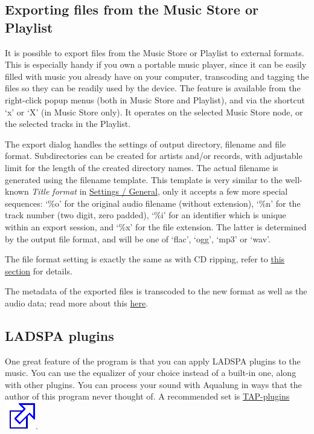 \documentclass[10pt,english]{article}
\begin{document}
\subsection{Exporting files from the Music Store or Playlist\label{idp623952}}



\noindent It is possible to export files from the Music Store or
Playlist to external formats. This is especially handy if you
own a portable music player, since it can be easily filled
with music you already have on your computer, transcoding and
tagging the files so they can be readily used by the
device. The feature is available from the right-click popup
menus (both in Music Store and Playlist), and via the shortcut
`x' or `X' (in Music Store only). It operates on the
selected Music Store node, or the selected tracks in the
Playlist.




The export dialog handles the settings of output directory,
filename and file format. Subdirectories can be created for
artists and/or records, with adjustable limit for the length
of the created directory names. The actual filename is
generated using the filename template. This template is very
similar to the well-known \textsl{Title format} in \hyperref[idp808416]{\color{blue}Settings / General}, only it
accepts a few more special sequences: `\%o' for the
original audio filename (without extension), `\%n' for the
track number (two digit, zero padded), `\%i' for an
identifier which is unique within an export session, and
`\%x' for the file extension. The latter is determined by
the output file format, and will be one of `flac',
`ogg', `mp3' or `wav'.




The file format setting is exactly the same as with CD
ripping, refer to \hyperref[idp589520]{\color{blue}this section} for
details.




The metadata of the exported files is transcoded to the new
format as well as the audio data; read more about this \hyperref[idp737408]{\color{blue}here}.




\subsection{LADSPA plugins\label{idp635136}}



\noindent One great feature of the program is that you can apply
LADSPA plugins to the music. You can use the equalizer of your
choice instead of a built-in one, along with other
plugins. You can process your sound with Aqualung in ways that
the author of this program never thought of. A recommended set
is \href{http://tap-plugins.sourceforge.net}{TAP-plugins\includegraphics[scale=0.5]{external.eps}}.
\end{document}
